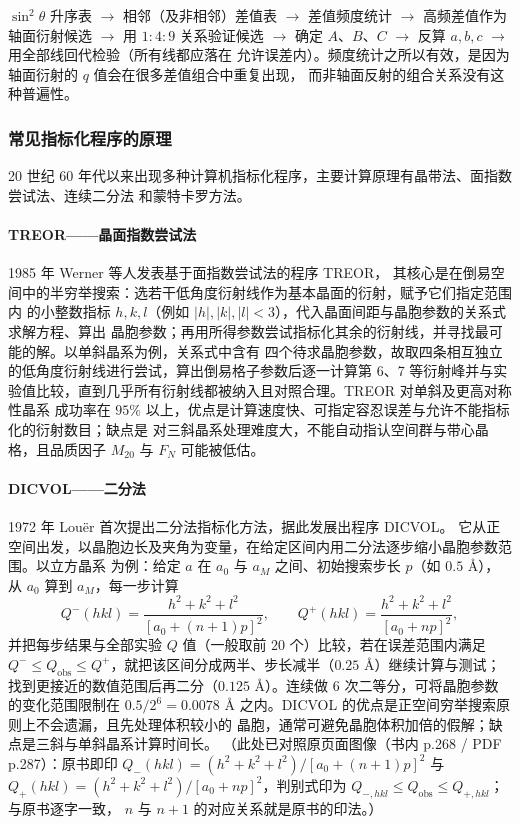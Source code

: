 \begin{dataflow}
$\sin^{2}\theta$ 升序表 $\rightarrow$ 相邻（及非相邻）差值表 $\rightarrow$ 差值频度统计
$\rightarrow$ 高频差值作为轴面衍射候选 $\rightarrow$ 用 $1:4:9$ 关系验证候选 $\rightarrow$ 确定
$A$、$B$、$C$ $\rightarrow$ 反算 $a,b,c$ $\rightarrow$ 用全部线回代检验（所有线都应落在
允许误差内）。频度统计之所以有效，是因为轴面衍射的 $q$ 值会在很多差值组合中重复出现，
而非轴面反射的组合关系没有这种普遍性。
\end{dataflow}

\subsubsection{常见指标化程序的原理}

20 世纪 60 年代以来出现多种计算机指标化程序，主要计算原理有晶带法、面指数尝试法、连续二分法
和蒙特卡罗方法。

\paragraph{TREOR——晶面指数尝试法}1985 年 Werner 等人发表基于面指数尝试法的程序 TREOR，
其核心是在倒易空间中的半穷举搜索：选若干低角度衍射线作为基本晶面的衍射，赋予它们指定范围内
的小整数指标 $h,k,l$（例如 $|h|,|k|,|l|<3$），代入晶面间距与晶胞参数的关系式求解方程、算出
晶胞参数；再用所得参数尝试指标化其余的衍射线，并寻找最可能的解。以单斜晶系为例，关系式中含有
四个待求晶胞参数，故取四条相互独立的低角度衍射线进行尝试，算出倒易格子参数后逐一计算第 6、7
等衍射峰并与实验值比较，直到几乎所有衍射线都被纳入且对照合理。TREOR 对单斜及更高对称性晶系
成功率在 $95\%$ 以上，优点是计算速度快、可指定容忍误差与允许不能指标化的衍射数目；缺点是
对三斜晶系处理难度大，不能自动指认空间群与带心晶格，且品质因子 $M_{20}$ 与 $F_{N}$ 可能被低估。

\paragraph{DICVOL——二分法}1972 年 Louër 首次提出二分法指标化方法，据此发展出程序 DICVOL。
它从正空间出发，以晶胞边长及夹角为变量，在给定区间内用二分法逐步缩小晶胞参数范围。以立方晶系
为例：给定 $a$ 在 $a_{0}$ 与 $a_{M}$ 之间、初始搜索步长 $p$（如 $0.5$ Å），从 $a_{0}$ 算到
$a_{M}$，每一步计算
\begin{equation}
Q^{-}(hkl)=\frac{h^{2}+k^{2}+l^{2}}{\left[a_{0}+(n+1)p\right]^{2}},\qquad
Q^{+}(hkl)=\frac{h^{2}+k^{2}+l^{2}}{\left[a_{0}+np\right]^{2}} ,
\label{eq:ch04b-dicvol}
\end{equation}
并把每步结果与全部实验 $Q$ 值（一般取前 $20$ 个）比较，若在误差范围内满足
$Q^{-}\le Q_{\mathrm{obs}}\le Q^{+}$，就把该区间分成两半、步长减半（$0.25$ Å）继续计算与测试；
找到更接近的数值范围后再二分（$0.125$ Å）。连续做 6 次二等分，可将晶胞参数的变化范围限制在
$0.5/2^{6}=0.0078$ Å 之内。DICVOL 的优点是正空间穷举搜索原则上不会遗漏，且先处理体积较小的
晶胞，通常可避免晶胞体积加倍的假解；缺点是三斜与单斜晶系计算时间长。
（此处已对照原页面图像（书内 p.268 / PDF p.287）：原书即印
$Q_{-}(hkl)=(h^{2}+k^{2}+l^{2})/[a_{0}+(n+1)p]^{2}$ 与
$Q_{+}(hkl)=(h^{2}+k^{2}+l^{2})/[a_{0}+np]^{2}$，判别式印为
$Q_{-,hkl}\le Q_{\mathrm{obs}}\le Q_{+,hkl}$； 与原书逐字一致，
$n$ 与 $n+1$ 的对应关系就是原书的印法。）


